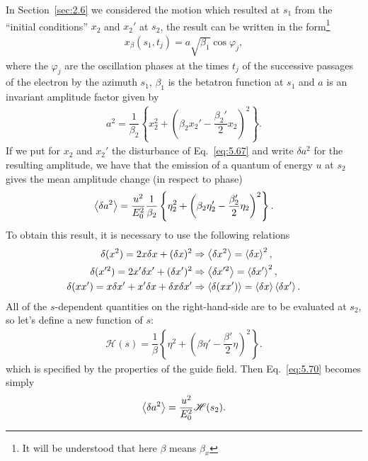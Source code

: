 \documentclass[../sands-adaptation.tex]{subfiles}
\begin{document}
In Section~\ref{sec:2.6} we considered the motion which resulted at $s_1$ from the ``initial
conditions'' $x_2$ and $x_2'$ at $s_2$, the result can be written in the form\footnote{It will be understood that here $\beta$ means $\beta_x$}
\begin{align} \label{eq:5.68}
	x_\beta(s_1,t_j) = a \sqrt{\beta_1} \cos \varphi_j,
\end{align}
where the $\varphi_j$ are the oscillation phases at the times $t_j$ of the successive passages
of the electron by the azimuth $s_1$, $\beta_1$ is the betatron function at $s_1$ and $a$ is an
invariant amplitude factor given by
\begin{align}
	a^2 = \dfrac{1}{\beta_2} \left\lbrace x_2^2 + \left( \beta_2 x_2' - \dfrac{\beta_2'}{2} x_2 \right)^2 \right\rbrace.
\end{align}
If we put for $x_2$ and $x_2'$ the disturbance of Eq.~\eqref{eq:5.67} and write $\delta a^2$ for the resulting amplitude, we have that the emission of a quantum of energy $u$ at $s_2$ gives the
mean amplitude change (in respect to phase)
\begin{align} \label{eq:5.70}
	\left< \delta a^2 \right> = \dfrac{u^2}{E_0^2} \dfrac{1}{\beta_2} \left\lbrace \eta_2^2 + \left( \beta_2 \eta_2' - \dfrac{\beta_2'}{2} \eta_2 \right)^2 \right\rbrace.
\end{align}
To obtain this result, it is necessary to use the following relations
\begin{align*}
	\delta(x^2) = 2 x \delta x + (\delta x)^2 & \Rightarrow \left< \delta x^2 \right> = \left< \delta x \right>^2,\\
    \delta(x'^2) = 2 x' \delta x' + (\delta x')^2 & \Rightarrow \left< \delta x'^2 \right> = \left< \delta x' \right>^2,\\
    \delta(x x') = x \delta x' + x' \delta x + \delta x \delta x' & \Rightarrow \left< \delta (x x') \right> = \left< \delta x \right> \left< \delta x' \right>.
\end{align*}
All of the $s$-dependent quantities on the right-hand-side are to be evaluated at $s_2$, so let's define a new function of $s$:
\begin{align} \label{eq:5.71}
	\mathscr{H}(s) = \dfrac{1}{\beta} \left\lbrace \eta^2 + \left( \beta \eta' - \dfrac{\beta'}{2} \eta \right)^2 \right\rbrace.
\end{align}
which is specified by the properties of the guide field. Then Eq.~\eqref{eq:5.70} becomes
simply
\begin{align} \label{eq:5.73}
	\left< \delta a^2 \right> = \dfrac{u^2}{E_0^2} \mathscr{H}(s_2).
\end{align}
\end{document}
